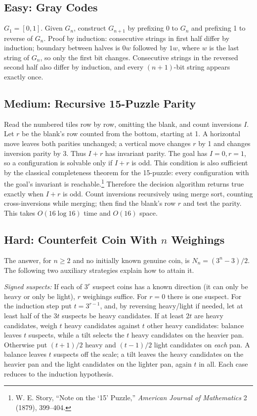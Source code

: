 \documentclass[12pt]{article}
\begin{document}
\subsection*{Easy: Gray Codes}
$G_1 = [0,1]$. Given $G_n$, construct $G_{n+1}$ by prefixing 0 to
$G_n$ and prefixing 1 to reverse of $G_n$. Proof by induction:
consecutive strings in first half differ by induction; boundary
between halves is $0w$ followed by $1w$, where $w$ is the last
string of $G_n$, so only the first bit changes. Consecutive strings
in the reversed second half also differ by induction, and every
$(n+1)$-bit string appears exactly once.

\subsection*{Medium: Recursive 15-Puzzle Parity}
Read the numbered tiles row by row, omitting the blank, and count
inversions $I$. Let $r$ be the blank's row counted from the bottom,
starting at 1. A horizontal move leaves both parities unchanged; a
vertical move changes $r$ by 1 and changes inversion parity by 3.
Thus $I+r$ has invariant parity. The goal has $I=0,r=1$, so a
configuration is solvable only if $I+r$ is odd. This condition is
also sufficient by the classical completeness theorem for the
15-puzzle: every configuration with the goal's invariant is
reachable.\footnote{W. E. Story, ``Note on the `15' Puzzle,''
\emph{American Journal of Mathematics} 2 (1879), 399--404.} Therefore
the decision algorithm returns true exactly when $I+r$ is odd. Count
inversions recursively using merge sort, counting cross-inversions
while merging; then find the blank's row $r$ and test the parity. This
takes $O(16\log16)$ time and $O(16)$ space.

\subsection*{Hard: Counterfeit Coin With $n$ Weighings}
The answer, for $n\ge2$ and no initially known genuine coin, is
$N_n=(3^n-3)/2$. The following two auxiliary strategies explain how
to attain it.

\emph{Signed suspects:} If each of $3^r$ suspect coins has a known
direction (it can only be heavy or only be light), $r$ weighings
suffice. For $r=0$ there is one suspect. For the induction step put
$t=3^{r-1}$, and, by reversing heavy/light if needed, let at least
half of the $3t$ suspects be heavy candidates. If at least $2t$
are heavy candidates, weigh $t$ heavy candidates against $t$ other
heavy candidates:
balance leaves $t$ suspects, while a tilt selects the $t$ heavy
candidates on the heavier pan. Otherwise put $(t+1)/2$ heavy and
$(t-1)/2$ light candidates on \emph{each} pan. A balance leaves $t$
suspects off the scale; a tilt leaves the heavy candidates on the
heavier pan and the light candidates on the lighter pan, again $t$
in all. Each case reduces to the induction hypothesis.
\end{document}
